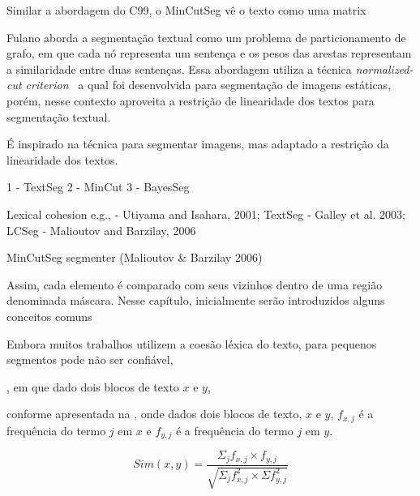 
Similar a abordagem do C99, o MinCutSeg vê o texto como uma matrix 



Fulano aborda a segmentação textual como um problema de particionamento de grafo, em que cada nó representa um sentença e os pesos das arestas representam a similaridade entre duas sentenças. Essa abordagem utiliza a técnica \textit{normalized-cut criterion}~\cite{Shi2000} a qual foi desenvolvida para segmentação de imagens estáticas, porém, nesse contexto aproveita a restrição de linearidade dos textos para segmentação textual.


É inspirado na técnica para segmentar imagens, mas adaptado a restrição da linearidade dos textos.
















1 - TextSeg
2 - MinCut
3 - BayesSeg


Lexical cohesion e.g., 
	- Utiyama and Isahara,     2001; {TextSeg}
	- Galley et al.            2003; {LCSeg}
	- Malioutov and Barzilay,  2006  {}








MinCutSeg segmenter (Malioutov & Barzilay 2006)




Assim, cada elemento é comparado com seus vizinhos dentro de uma região denominada máscara.
Nesse capítulo, inicialmente serão introduzidos alguns conceitos comuns 



Embora muitos trabalhos utilizem a coesão léxica do texto, para pequenos segmentos pode não ser confiável,





, em que dado dois blocos de texto $x$ e $y$,

conforme apresentada na , onde dados dois blocos de texto, $x$ e $y$, $f_{x,j}$ é a frequência do termo $j$ em $x$ e $f_{y,j}$ é a frequência do termo $j$ em $y$.

\begin{equation}
	Sim(x,y) = \frac
	{\Sigma_j f_{x,j} \times f_{y,j}}
	{\sqrt{\Sigma_j f^2_{x,j} \times \Sigma f^2_{y,j}}}
	\label{equ:cosine}
\end{equation}




